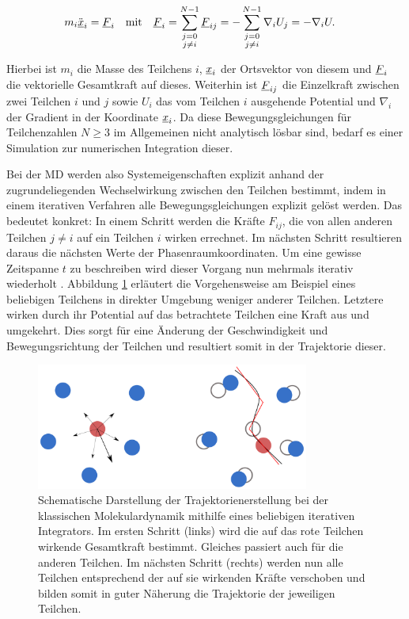 		\begin{align}
			m_i \ddot{\underline{x}}_i &= \underline{F}_i
			& \text{mit} &&
			\underline{F}_{i} &= \sum_{\substack{j=0\\j \neq i}}^{N-1} \underline{F}_{ij}
			= -\sum_{\substack{j=0\\j \neq i}}^{N-1} \nabla_i U_j = -\nabla_i U
			\label{eq:newtone_dgl}
			.
		\end{align}

		Hierbei ist $m_i$ die Masse des Teilchens $i$, $\underline{x}_i$ der Ortsvektor von diesem und
		$\underline{F}_{i}$ die vektorielle Gesamtkraft auf dieses. Weiterhin ist $\underline{F}_{ij}$ die
		Einzelkraft zwischen zwei Teilchen $i$ und $j$ sowie $U_i$ das vom Teilchen $i$ ausgehende
		Potential und $\nabla_i$ der Gradient in der Koordinate $\underline{x}_i$. Da diese
		Bewegungsgleichungen für Teilchenzahlen $N \geq 3$ im Allgemeinen nicht analytisch lösbar
		sind, %
		bedarf es einer Simulation zur numerischen Integration dieser.

		Bei der MD werden also Systemeigenschaften explizit anhand der zugrundeliegenden
		Wechselwirkung zwischen den Teilchen bestimmt, indem in einem iterativen Verfahren alle
		Bewegungsgleichungen explizit gelöst werden. Das bedeutet konkret: In einem Schritt werden
		die Kräfte $F_{ij}$, die von allen anderen Teilchen $j \neq i$ auf ein Teilchen $i$ wirken
		errechnet. Im nächsten Schritt resultieren daraus die nächsten Werte der
		Phasenraumkoordinaten. Um eine gewisse Zeitspanne $t$ zu beschreiben wird dieser Vorgang
		nun mehrmals iterativ wiederholt \cite{allen2004introduction}. Abbildung
		\ref{fig:scheme_md} erläutert die Vorgehensweise am Beispiel eines beliebigen Teilchens in
		direkter Umgebung weniger anderer Teilchen. Letztere wirken durch ihr Potential auf das
		betrachtete Teilchen eine Kraft aus und umgekehrt. Dies sorgt für eine Änderung der
		Geschwindigkeit und Bewegungsrichtung der Teilchen und resultiert somit in der Trajektorie
		dieser.

		\begin{figure}[!ht]
			\centering
			\includegraphics[width=0.8\textwidth]{chapter/main/theory/img/scheme_md.png}
			\caption{Schematische Darstellung der Trajektorienerstellung bei der klassischen
			Molekulardynamik mithilfe eines beliebigen iterativen Integrators. Im ersten Schritt
			(links) wird die auf das rote Teilchen wirkende Gesamtkraft bestimmt. Gleiches
			passiert auch für die anderen Teilchen. Im nächsten Schritt (rechts) werden nun alle
			Teilchen entsprechend der auf sie wirkenden Kräfte verschoben und bilden somit in
			guter Näherung die Trajektorie der jeweiligen Teilchen.
			\cite{sonntag2011computer}}
			\label{fig:scheme_md}
		\end{figure}

